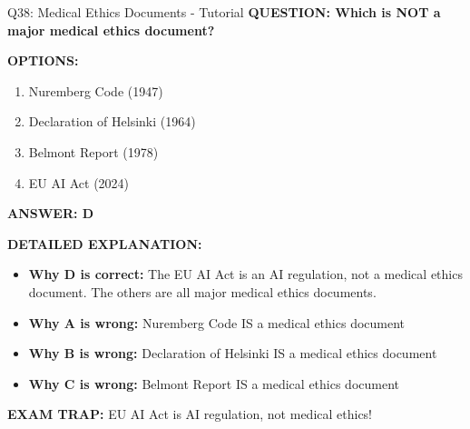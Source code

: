 \documentclass[8pt]{beamer}
\begin{document}
	\begin{frame}{Q38: Medical Ethics Documents - Tutorial}
		\fontsize{6.5}{7.5}\selectfont
		\textbf{QUESTION: Which is NOT a major medical ethics document?}
		
		\vspace{0.1cm}
		\textbf{OPTIONS:}
		\begin{enumerate}
			\item Nuremberg Code (1947)
			\item Declaration of Helsinki (1964)
			\item Belmont Report (1978)
			\item EU AI Act (2024)
		\end{enumerate}
		
		\vspace{0.1cm}
		\textcolor{myblue}{\textbf{ANSWER: D}}
		
		\vspace{0.1cm}
		\textbf{DETAILED EXPLANATION:}
		\begin{itemize}
			\item \textbf{Why D is correct:} The EU AI Act is an AI regulation, not a medical ethics document. The others are all major medical ethics documents.
			\item \textbf{Why A is wrong:} Nuremberg Code IS a medical ethics document
			\item \textbf{Why B is wrong:} Declaration of Helsinki IS a medical ethics document
			\item \textbf{Why C is wrong:} Belmont Report IS a medical ethics document
		\end{itemize}
		
		\textcolor{myred}{\textbf{EXAM TRAP:}} EU AI Act is \textcolor{myblue}{AI regulation}, not medical ethics!
	\end{frame}
	
\end{document}
